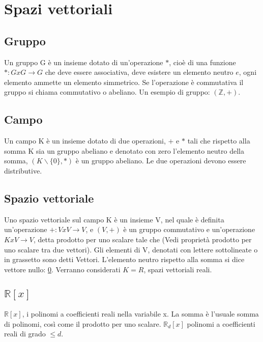 \chapter{Spazi vettoriali}
\section{Gruppo}
Un gruppo G \`e un insieme dotato di un'operazione $*$, cio\`e di una funzione $*:GxG\rightarrow G$ che deve essere associativa, deve esistere un elemento neutro $e$, ogni
elemento ammette un elemento simmetrico. Se l'operazione \`e commutativa il gruppo si chiama commutativo o abeliano. Un esempio di gruppo: $(\mathbb{Z},+)$. 
\section{Campo}
Un campo K \`e un insieme dotato di due operazioni, $+$ e $*$ tali che rispetto alla somma K sia un gruppo abeliano e denotato con zero l'elemento neutro della somma, $(K
\backslash\{0\},*)$ \`e un gruppo abeliano. Le due operazioni devono essere distributive.
\section{Spazio vettoriale}
Uno spazio vettoriale sul campo K \`e un insieme V, nel quale \`e definita un'operazione $+:VxV\rightarrow V$, e $(V,+)$  \`e  un gruppo commutativo e un'operazione 
$KxV\rightarrow V$, detta prodotto per uno scalare tale che (Vedi propriet\`a prodotto per uno scalare tra due vettori). Gli elementi di V, denotati con lettere sottolineate 
o in grassetto sono detti Vettori. L'elemento neutro rispetto alla somma si dice vettore nullo: \underline{0}. Verranno considerati $K=R$, spazi vettoriali reali. 
\section{$\mathbb{R}[x]$}
$\mathbb{R}[x]$, i polinomi a coefficienti reali nella variabile x. La somma \`e l'usuale somma di polinomi, cos\`i come il prodotto per uno scalare.
$\mathbb{R}_d[x]$ polinomi a coefficienti reali di grado $\le d$.
